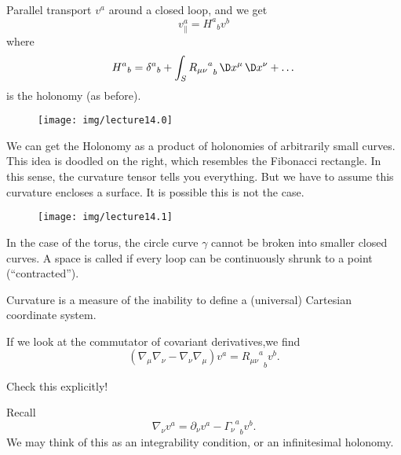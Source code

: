 
Parallel transport $v^{a}$ around a closed loop, and we get
\begin{equation}
v^{a}_{\|}={H^{a}}_{b}v^{b}
\end{equation}
where
\begin{equation}
{H^{a}}_{b}={\delta^{a}}_{b}+\int_{S}{{R_{\mu\nu}}^{a}}_{b}
\,\D x^{\mu}\,\D x^{\nu}+\dots
\end{equation}
is the holonomy (as before).

\begin{wrapfigure}{r}{4pc}
  \vspace{-1pc}
  \texttt{[image: img/lecture14.0]}
  \vspace{-2pc}
\end{wrapfigure}
We can get the Holonomy as a product of holonomies of arbitrarily
small curves. This idea is doodled on the right, which resembles
the Fibonacci rectangle. In this sense, the curvature tensor
tells you everything. But we have to assume this curvature
encloses a surface. It is possible this is not the case.

\begin{wrapfigure}{l}{4pc}
  \vspace{-1pc}
  \texttt{[image: img/lecture14.1]}
  \vspace{-2pc}
\end{wrapfigure}
\noindent In the case of the torus, the circle curve $\gamma$
cannot be broken into smaller closed curves. A space is called
 if every loop can be continuously
shrunk to a point (``contracted'').

Curvature is a measure of the inability to define a (universal)
Cartesian coordinate system.

If we look at the commutator of covariant derivatives,we find
\begin{equation}
(\nabla_{\mu}\nabla_{\nu}-\nabla_{\nu}\nabla_{\mu})v^{a}
={{R_{\mu\nu}}^{a}}_{b}v^{b}.
\end{equation}
\begin{xca}
Check this explicitly!
\end{xca}
\noindent\ignorespaces Recall
\begin{equation}
\nabla_{\nu}v^{a}=\partial_{\nu}v^{a}-{{\Gamma_{\nu}}^{a}}_{b}v^{b}.
\end{equation}
We may think of this as an integrability condition, or an
infinitesimal holonomy.


